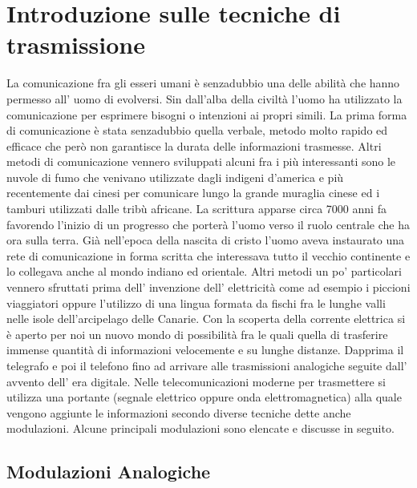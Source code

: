 \chapter{Introduzione sulle tecniche di trasmissione}
\label{cha:intro}

 La comunicazione fra gli esseri umani è senzadubbio una delle abilità che hanno permesso all' uomo di evolversi. Sin dall'alba della civiltà l'uomo ha utilizzato la comunicazione per esprimere bisogni o intenzioni ai propri simili. La prima forma di comunicazione è stata senzadubbio quella verbale, metodo molto rapido ed efficace che però non garantisce la durata delle informazioni trasmesse. Altri metodi di comunicazione vennero sviluppati alcuni fra i più interessanti sono le nuvole di fumo che venivano utilizzate dagli indigeni d'america e più recentemente dai cinesi per comunicare lungo la grande muraglia cinese ed i tamburi utilizzati dalle tribù africane. La scrittura apparse circa 7000 anni fa favorendo l'inizio di un progresso che porterà l'uomo verso il ruolo centrale che ha ora sulla terra. Già nell'epoca della nascita di cristo l'uomo aveva instaurato una rete di comunicazione in forma scritta che interessava tutto il vecchio continente e lo collegava anche al mondo indiano ed orientale. Altri metodi un po' particolari vennero sfruttati prima dell' invenzione dell' elettricità come ad esempio i piccioni viaggiatori oppure l'utilizzo di una lingua formata da fischi fra le lunghe valli nelle isole dell'arcipelago delle Canarie.
Con la scoperta della corrente elettrica si è aperto per noi un nuovo mondo di possibilità fra le quali quella di trasferire immense quantità di informazioni velocemente e su lunghe distanze. Dapprima il telegrafo e poi il telefono fino ad arrivare alle trasmissioni analogiche seguite dall' avvento dell' era digitale. Nelle telecomunicazioni moderne per trasmettere si utilizza una portante (segnale elettrico oppure onda elettromagnetica) alla quale vengono aggiunte le informazioni secondo diverse tecniche dette anche modulazioni. Alcune principali modulazioni sono elencate e discusse in seguito.


\section{Modulazioni Analogiche}
\label{sec:context}

